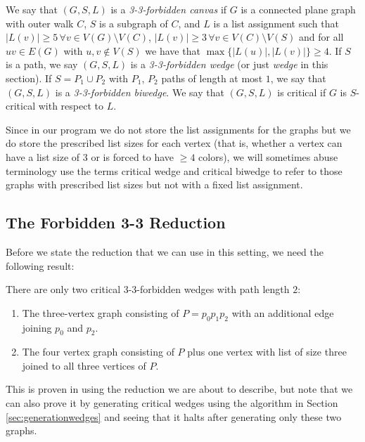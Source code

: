 \begin{definition}
	We say that $(G, S, L)$ is a \emph{3-3-forbidden canvas} if $G$ is a connected plane graph
 with outer walk $C$, $S$ is a subgraph of $C$, and $L$ is a list assignment
  such that $|L(v)| \geq 5 \, \forall v \in V(G) \setminus V(C)$,
   $|L(v)| \geq 3 \, \forall v \in V(C) \setminus V(S)$ and for all $uv \in E(G)$ with 
   $u, v \not\in V(S)$ we have that $\max\{|L(u)|, |L(v)|\} \geq 4$. If $S$ is a path,
    we say $(G, S, L)$ is a \emph{3-3-forbidden wedge} (or just \emph{wedge} in this section). 
    If $S = P_1 \cup P_2$ with $P_1$, $P_2$ paths of length at most $1$, we say that $(G, S, L)$ is a
    \emph{3-3-forbidden biwedge}. We say that $(G, S, L)$ is critical if $G$ is $S$-critical
    with respect to $L$.
\end{definition}

Since in our program we do not store the list assignments for the graphs but we do store the 
prescribed list sizes for each vertex (that is, whether a vertex can have a list size of $3$ or
is forced to have $\geq 4$ colors), we will sometimes abuse terminology
 use the terms critical wedge and critical biwedge
to refer to those graphs with prescribed list sizes but not with a fixed list assignment.

\subsection{The Forbidden 3-3 Reduction}

Before we state the reduction that we can use in this setting, we need the following result:

\begin{proposition}
\label{twocriticalwedgesprop}
There are only two critical 3-3-forbidden wedges with path length $2$:

\begin{enumerate}
	\item The three-vertex graph consisting of $P = p_0p_1p_2$ with an additional edge joining
	$p_0$ and $p_2$.
	\item The four vertex graph consisting of $P$ plus one vertex with list of size three joined
	to all three vertices of $P$.
\end{enumerate}

\end{proposition}

This is proven in \cite{crossingsfarapart} using the reduction we are about to describe,
but note that we can also prove it by generating critical wedges using the algorithm in 
Section \ref{sec:generationwedges} and seeing that it halts after generating only these two graphs.

